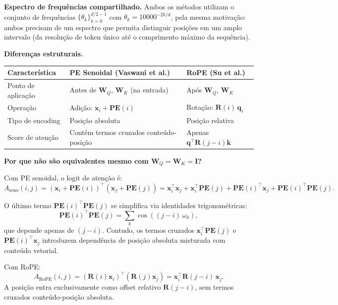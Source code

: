 \documentclass{dlproblemset}
\begin{document}
\textbf{Espectro de frequências compartilhado.}
Ambos os métodos utilizam o conjunto de frequências
$\{\theta_k\}_{k=0}^{d/2-1}$ com $\theta_k = 10000^{-2k/d}$, pela mesma
motivação: ambos precisam de um espectro que permita distinguir posições em um
amplo intervalo (da resolução de token único até o comprimento máximo da sequência).

\textbf{Diferenças estruturais.}

\begin{center}
\begin{tabular}{lll}
\toprule
Característica & PE Senoidal (Vaswani et al.) & RoPE (Su et al.) \\
\midrule
Ponto de aplicação & Antes de $\mathbf{W}_Q$, $\mathbf{W}_K$ (na entrada) & Após $\mathbf{W}_Q$, $\mathbf{W}_K$ \\
Operação & Adição: $\mathbf{x}_i + \mathbf{PE}(i)$ & Rotação: $\mathbf{R}(i)\,\mathbf{q}_i$ \\
Tipo de encoding & Posição absoluta & Posição relativa \\
Score de atenção & Contém termos cruzados conteúdo-posição & Apenas $\mathbf{q}^\top \mathbf{R}(j-i)\mathbf{k}$ \\
\bottomrule
\end{tabular}
\end{center}

\textbf{Por que não são equivalentes mesmo com $\mathbf{W}_Q = \mathbf{W}_K = \mathbf{I}$?}

Com PE senoidal, o logit de atenção é:
\[
  A_{\mathrm{seno}}(i,j)
  = (\mathbf{x}_i + \mathbf{PE}(i))^\top (\mathbf{x}_j + \mathbf{PE}(j))
  = \mathbf{x}_i^\top \mathbf{x}_j
    + \mathbf{x}_i^\top \mathbf{PE}(j)
    + \mathbf{PE}(i)^\top \mathbf{x}_j
    + \mathbf{PE}(i)^\top \mathbf{PE}(j).
\]

O último termo $\mathbf{PE}(i)^\top \mathbf{PE}(j)$ se simplifica via identidades
trigonométricas:
\[
  \mathbf{PE}(i)^\top \mathbf{PE}(j)
  = \sum_k \cos\!\!\left((j-i)\,\omega_k\right),
\]
que depende apenas de $(j-i)$. Contudo, os termos cruzados
$\mathbf{x}_i^\top \mathbf{PE}(j)$ e $\mathbf{PE}(i)^\top \mathbf{x}_j$
introduzem dependência de posição absoluta misturada com conteúdo vetorial.

Com RoPE:
\[
  A_{\mathrm{RoPE}}(i,j)
  = (\mathbf{R}(i)\mathbf{x}_i)^\top (\mathbf{R}(j)\mathbf{x}_j)
  = \mathbf{x}_i^\top \mathbf{R}(j-i)\,\mathbf{x}_j.
\]
A posição entra exclusivamente como offset relativo $\mathbf{R}(j-i)$, sem termos
cruzados conteúdo-posição absoluta.
\end{document}

